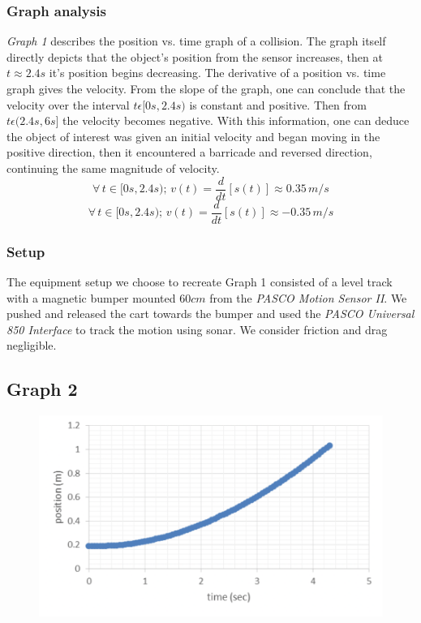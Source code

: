 \documentclass[11pt, letterpaper, includehead]{article}
\begin{document}
  \subsubsection{Graph analysis}
  \emph{Graph 1} describes the position vs. time graph of a collision.
  The graph itself directly depicts that the object's position from the sensor increases, then at
  $t\approx2.4s$ it's position begins decreasing. The derivative of a position vs. time graph gives the velocity. 
  From the slope of the graph, one can conclude that the velocity over the interval $t\epsilon[0s, 2.4s)$
  is constant and positive. Then from $t \epsilon (2.4s, 6s]$ the velocity becomes negative. With this 
  information, one can deduce the object of interest was given an initial velocity and began moving
  in the positive direction, then it encountered a barricade and reversed direction, continuing the same
  magnitude of velocity.\\
  $$\forall \, t \in [0s, 2.4s); \, v(t) = \frac{d}{dt}[s(t)] \approx 0.35 \, m/s$$
  $$\forall \, t \in [0s, 2.4s); \, v(t) = \frac{d}{dt}[s(t)] \approx -0.35 \, m/s$$


  \subsubsection{Setup}
  The equipment setup we choose to recreate Graph 1 consisted of a level track with a magnetic 
  bumper mounted $60cm$ from the \emph{PASCO Motion Sensor II}. We pushed and released the cart towards the bumper 
  and used the \emph{PASCO Universal 850 Interface} to track the motion using sonar. We consider 
  friction and drag negligible.\\


  
  \subsection{Graph 2}

  \begin{figure}[H] %
    \centering 
    \includegraphics[width=\linewidth]{graph_2.png}
    \label{fig:graph1}
  \end{figure}
\end{document}
